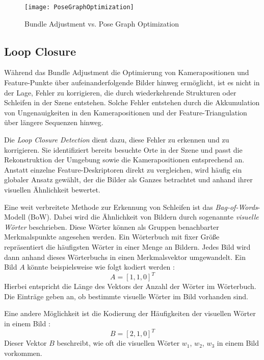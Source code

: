 \begin{figure}[ht]
    \centering
    \texttt{[image: PoseGraphOptimization]}
    \caption{Bundle Adjustment vs. Pose Graph Optimization \cite{gao2021vSLAM}\label{fig:PoseGraph}}\par
\end{figure}

\subsection{Loop Closure}

Während das Bundle Adjustment die Optimierung von Kamerapositionen und Feature-Punkte über aufeinanderfolgende Bilder hinweg ermöglicht, ist es nicht in der Lage, Fehler zu korrigieren, die durch wiederkehrende Strukturen oder Schleifen in der Szene entstehen. Solche Fehler entstehen durch die Akkumulation von Ungenauigkeiten in den Kamerapositionen und der Feature-Triangulation über längere Sequenzen hinweg. \cite{gao2021vSLAM, cadena2016slam}

Die \textit{Loop Closure Detection} dient dazu, diese Fehler zu erkennen und zu korrigieren. Sie identifiziert bereits besuchte Orte in der Szene und passt die Rekonstruktion der Umgebung sowie die Kamerapositionen entsprechend an. Anstatt einzelne Feature-Deskriptoren direkt zu vergleichen, wird häufig ein globaler Ansatz gewählt, der die Bilder als Ganzes betrachtet und anhand ihrer visuellen Ähnlichkeit bewertet. \cite{gao2021vSLAM, cadena2016slam}

Eine weit verbreitete Methode zur Erkennung von Schleifen ist das \emph{Bag-of-Words}-Modell (BoW). Dabei wird die Ähnlichkeit von Bildern durch sogenannte \emph{visuelle Wörter} beschrieben. Diese Wörter können als Gruppen benachbarter Merkmalspunkte angesehen werden. Ein Wörterbuch mit fixer Größe repräsentiert die häufigsten Wörter in einer Menge an Bildern. Jedes Bild wird dann anhand dieses Wörterbuchs in einen Merkmalsvektor umgewandelt. Ein Bild \( A \) könnte beispielsweise wie folgt kodiert werden \cite{gao2021vSLAM, yoon2024BoW}: 
\begin{equation}
    A = [1, 1, 0]^T
\end{equation}
Hierbei entspricht die Länge des Vektors der Anzahl der Wörter im Wörterbuch. Die Einträge geben an, ob bestimmte visuelle Wörter im Bild vorhanden sind. 

Eine andere Möglichkeit ist die Kodierung der Häufigkeiten der visuellen Wörter in einem Bild \cite{gao2021vSLAM}:
\begin{equation}
    B = [2, 1, 0]^T
\end{equation}
Dieser Vektor \( B \) beschreibt, wie oft die visuellen Wörter \( w_1 \), \( w_2 \), \( w_3 \) in einem Bild vorkommen. 

